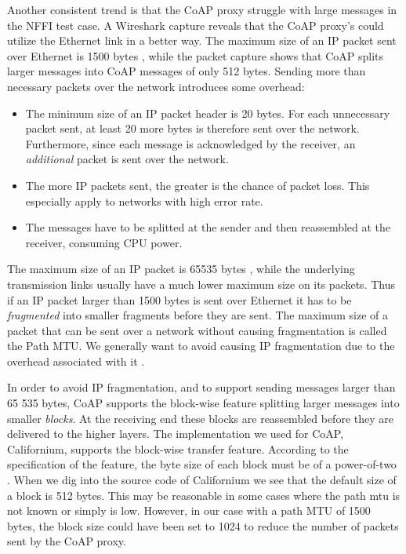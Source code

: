 Another consistent trend is that the CoAP proxy struggle with large messages in
the NFFI test case. A Wireshark capture reveals that the CoAP proxy's could
utilize the Ethernet link in a better way. The maximum size of an IP packet sent
over Ethernet is 1500 bytes \cite{rfc-894}, while the packet capture shows that
CoAP splits larger messages into CoAP messages of only 512 bytes. Sending more
than necessary packets over the network introduces some overhead:

\begin{itemize}

    \item The minimum size of an IP packet header is 20 bytes. For each
    unnecessary packet sent, at least 20 more bytes is therefore sent over the
    network. Furthermore, since each message is acknowledged by the receiver, an
    \textit{additional} packet is sent over the network.

    \item The more IP packets sent, the greater is the chance of packet loss.
    This especially apply to networks with high error rate.

    \item The messages have to be splitted at the sender and then reassembled at
    the receiver, consuming CPU power.

\end{itemize}

The maximum size of an IP packet is 65535 bytes \cite{rfc-791}, while the underlying
transmission links usually have a much lower maximum size on its packets. Thus if
an IP packet larger than 1500 bytes is sent over Ethernet it has to be
\textit{fragmented} into smaller fragments before they are sent. The maximum
size of a packet that can be sent over a network without causing fragmentation
is called the Path MTU. We generally want to avoid causing IP fragmentation due
to the overhead associated with it \cite{genkov2006avoiding}.

In order to avoid IP fragmentation, and to support sending messages larger than
65 535 bytes, CoAP supports the block-wise feature splitting larger messages
into smaller \textit{blocks}. At the receiving end these blocks are reassembled
before they are delivered to the higher layers. The implementation we used for
CoAP, Californium, supports the block-wise transfer feature. According to the
specification of the feature, the byte size of each block must be of a
power-of-two \cite{draft-coap-blockwise}. When we dig into the source code of
Californium we see that the default size of a block is 512 bytes. This may be
reasonable in some cases where the path \gls{mtu} is not known or simply is low.
However, in our case with a path MTU of 1500 bytes, the block size could have
been set to 1024 to reduce the number of packets sent by the CoAP proxy.

